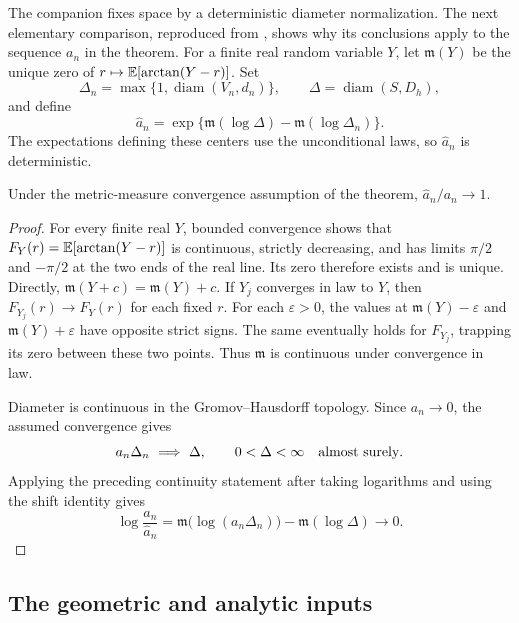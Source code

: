 The companion fixes space by a deterministic diameter normalization.  The
next elementary comparison, reproduced from \cite[Lemma~2.3]{SC}, shows
why its conclusions apply to the sequence \(a_n\) in the theorem.
For a finite real random variable \(Y\), let \(\mathfrak m(Y)\) be the
unique zero of \(r\mapsto\mathbb E[\arctan(Y-r)]\).  Set
\[
 \Delta_n=\max\{1,\operatorname{diam}(V_n,d_n)\},\qquad
 \Delta=\operatorname{diam}(S,D_h),
\]
and define
\begin{equation}\label{eq:diameter-normalization}
 \widehat a_n=
 \exp\{\mathfrak m(\log\Delta)-\mathfrak m(\log\Delta_n)\}.
\end{equation}
The expectations defining these centers use the unconditional laws, so
\(\widehat a_n\) is deterministic.

\begin{lemma}
\label{lem:space-normalization}
Under the metric-measure convergence assumption of the theorem,
\(\widehat a_n/a_n\to1\).
\end{lemma}

\begin{proof}
For every finite real \(Y\), bounded convergence shows that
\(F_Y(r)=\mathbb E[\arctan(Y-r)]\) is continuous, strictly decreasing, and
has limits \(\pi/2\) and \(-\pi/2\) at the two ends of the real line.
Its zero therefore exists and is unique.  Directly,
\(\mathfrak m(Y+c)=\mathfrak m(Y)+c\).  If \(Y_j\) converges in law
to \(Y\), then \(F_{Y_j}(r)\to F_Y(r)\) for each fixed \(r\).
For each \(\varepsilon>0\), the values at
\(\mathfrak m(Y)-\varepsilon\) and
\(\mathfrak m(Y)+\varepsilon\) have opposite strict signs.  The same
eventually holds for \(F_{Y_j}\), trapping its zero between these two
points.  Thus \(\mathfrak m\) is continuous under convergence in law.

Diameter is continuous in the Gromov--Hausdorff topology.  Since
\(a_n\to0\), the assumed convergence gives
\[
 a_n\Delta_n\ \Longrightarrow\ \Delta,
 \qquad 0<\Delta<\infty\quad\hbox{almost surely}.
\]
Applying the preceding continuity statement after taking logarithms and
using the shift identity gives
\[
 \log\frac{a_n}{\widehat a_n}
 =\mathfrak m\bigl(\log(a_n\Delta_n)\bigr)
      -\mathfrak m(\log\Delta)\longrightarrow0.
\]
\end{proof}

\subsection{The geometric and analytic inputs}

